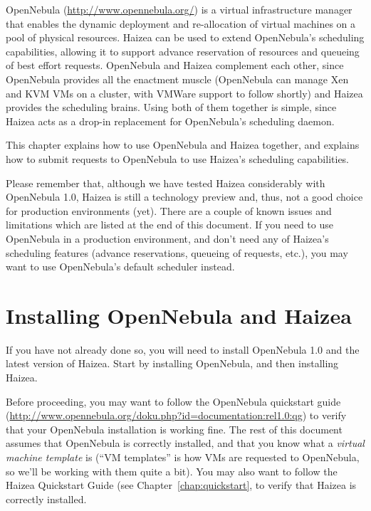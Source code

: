 OpenNebula (\url{http://www.opennebula.org/}) is a virtual infrastructure manager that enables the dynamic deployment and re-allocation of virtual machines on a pool of physical resources. Haizea can be used to extend OpenNebula's scheduling capabilities, allowing it to support advance reservation of resources and queueing of best effort requests. OpenNebula and Haizea complement each other, since OpenNebula provides all the enactment muscle (OpenNebula can manage Xen and KVM VMs on a cluster, with VMWare support to follow shortly) and Haizea provides the scheduling brains. Using both of them together is simple, since Haizea acts as a drop-in replacement for OpenNebula's scheduling daemon. 

This chapter explains how to use OpenNebula and Haizea together, and explains how to submit requests to OpenNebula to use Haizea's scheduling capabilities.

\begin{warning}
Please remember that, although we have tested Haizea considerably with OpenNebula 1.0, Haizea is still a technology preview and, thus, not a good choice for production environments (yet). There are a couple of known issues and limitations which are listed at the end of this document. If you need to use OpenNebula in a production environment, and don't need any of Haizea's scheduling features (advance reservations, queueing of requests, etc.), you may want to use OpenNebula's default scheduler instead.
\end{warning}

\section{Installing OpenNebula and Haizea}

If you have not already done so, you will need to install OpenNebula 1.0 and the latest version of Haizea. Start by installing OpenNebula, and then installing Haizea.

Before proceeding, you may want to follow the OpenNebula quickstart guide (\url{http://www.opennebula.org/doku.php?id=documentation:rel1.0:qg}) to verify that your OpenNebula installation is working fine. The rest of this document assumes that OpenNebula is correctly installed, and that you know what a \emph{virtual machine template} is (``VM templates'' is how VMs are requested to OpenNebula, so we'll be working with them quite a bit). You may also want to follow the Haizea Quickstart Guide (see Chapter~\ref{chap:quickstart}, to verify that Haizea is correctly installed.


